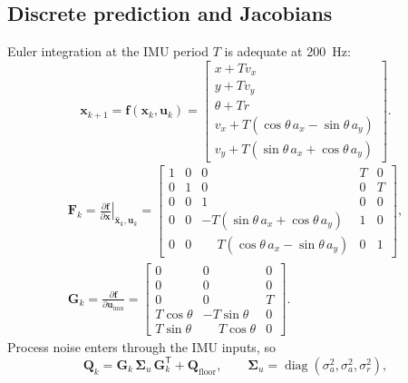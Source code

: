 \documentclass[11pt,a4paper]{article}
\newcommand{\vect}[1]{\bm{#1}}
\newcommand{\mat}[1]{\bm{#1}}
\newcommand{\T}{^{\mathsf{T}}}
\newcommand{\diag}{\operatorname{diag}}
\newcommand{\hx}{\hat{\vect{x}}}
\begin{document}
\subsection{Discrete prediction and Jacobians}
Euler integration at the IMU period $T$ is adequate at 200~Hz:
\begin{equation}
\vect x_{k+1} = \vect f(\vect x_k,\vect u_k) =
\begin{bmatrix}
x + T v_x \\
y + T v_y \\
\theta + T r \\
v_x + T(\cos\theta\,a_x - \sin\theta\,a_y) \\
v_y + T(\sin\theta\,a_x + \cos\theta\,a_y)
\end{bmatrix}.
\label{eq:f}
\end{equation}
\begin{gather}
\mat F_k = \left.\frac{\partial\vect f}{\partial\vect x}\right|_{\hx_{k},\vect u_k} =
\begin{bmatrix}
1 & 0 & 0 & T & 0 \\
0 & 1 & 0 & 0 & T \\
0 & 0 & 1 & 0 & 0 \\
0 & 0 & -T(\sin\theta\,a_x+\cos\theta\,a_y) & 1 & 0 \\
0 & 0 & \phantom{-}T(\cos\theta\,a_x-\sin\theta\,a_y) & 0 & 1
\end{bmatrix},
\label{eq:FG}\\
\mat G_k = \frac{\partial\vect f}{\partial\vect u_{\mathrm{imu}}} =
\begin{bmatrix}
0 & 0 & 0 \\
0 & 0 & 0 \\
0 & 0 & T \\
T\cos\theta & -T\sin\theta & 0 \\
T\sin\theta & \phantom{-}T\cos\theta & 0
\end{bmatrix}.
\end{gather}
Process noise enters through the IMU inputs, so
\begin{equation}
\mat Q_k = \mat G_k\,\mat\Sigma_u\,\mat G_k\T + \mat Q_{\mathrm{floor}},
\qquad
\mat\Sigma_u = \diag(\sigma_a^2,\sigma_a^2,\sigma_r^2),
\label{eq:Q}
\end{equation}
\end{document}
